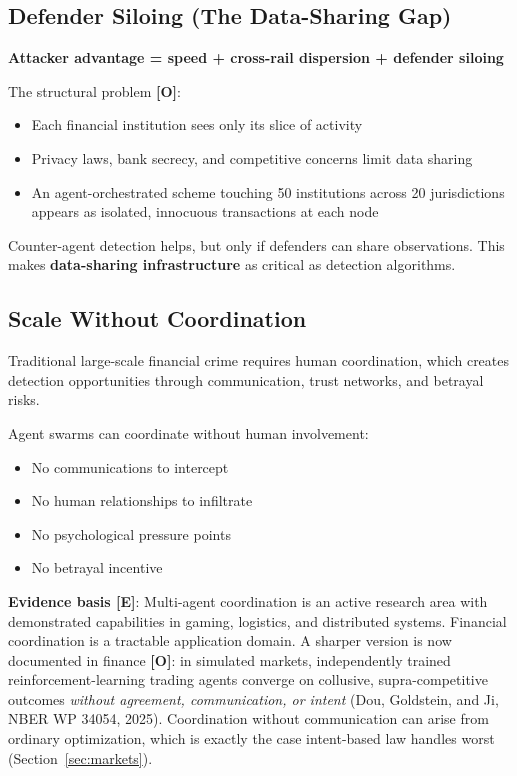 \documentclass[11pt,letterpaper]{article}
\begin{document}
\subsection{Defender Siloing (The Data-Sharing Gap)}

\begin{criticalbox}
\textbf{Attacker advantage = speed + cross-rail dispersion + defender siloing}

The structural problem \textbf{[O]}:
\begin{itemize}
  \item Each financial institution sees only its slice of activity
  \item Privacy laws, bank secrecy, and competitive concerns limit data sharing
  \item An agent-orchestrated scheme touching 50 institutions across 20 jurisdictions appears as isolated, innocuous transactions at each node
\end{itemize}

Counter-agent detection helps, but only if defenders can share observations. This makes \textbf{data-sharing infrastructure} as critical as detection algorithms.
\end{criticalbox}

\subsection{Scale Without Coordination}

Traditional large-scale financial crime requires human coordination, which creates detection opportunities through communication, trust networks, and betrayal risks.

Agent swarms can coordinate without human involvement:
\begin{itemize}
  \item No communications to intercept
  \item No human relationships to infiltrate
  \item No psychological pressure points
  \item No betrayal incentive
\end{itemize}

\textbf{Evidence basis [E]}: Multi-agent coordination is an active research area with demonstrated capabilities in gaming, logistics, and distributed systems. Financial coordination is a tractable application domain. A sharper version is now documented in finance \textbf{[O]}: in simulated markets, independently trained reinforcement-learning trading agents converge on collusive, supra-competitive outcomes \textit{without agreement, communication, or intent} (Dou, Goldstein, and Ji, NBER WP 34054, 2025). Coordination without communication can arise from ordinary optimization, which is exactly the case intent-based law handles worst (Section~\ref{sec:markets}).
\end{document}
